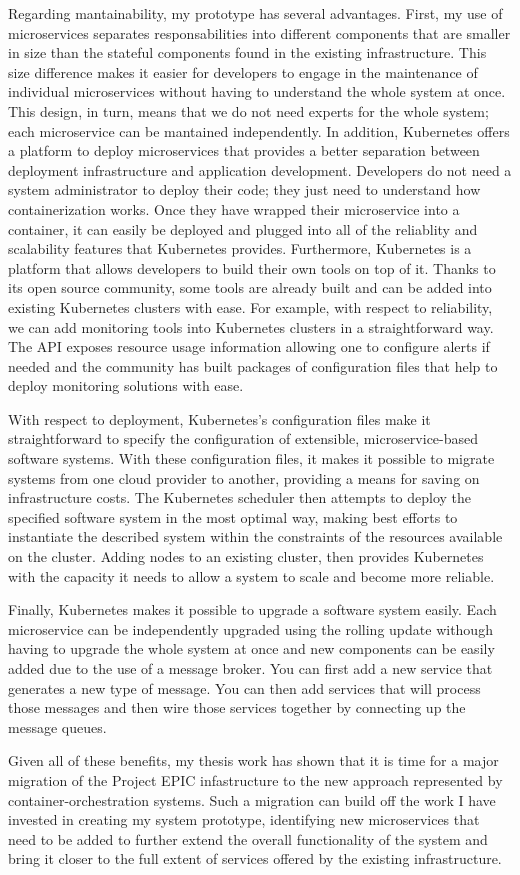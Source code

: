 Regarding mantainability, my prototype has several advantages. First, my use of microservices separates responsabilities into different components that are smaller in size than the stateful components found in the existing infrastructure. This size difference makes it easier for developers to engage in the maintenance of individual microservices without having to understand the whole system at once. This design, in turn, means that we do not need experts for the whole system; each microservice can be mantained independently. In addition, Kubernetes offers a platform to deploy microservices that provides a better separation between deployment infrastructure and application development. Developers do not need a system administrator to deploy their code; they just need to understand how containerization works. Once they have wrapped their microservice into a container, it can easily be deployed and plugged into all of the reliablity and scalability features that Kubernetes provides. Furthermore, Kubernetes is a platform that allows developers to build their own tools on top of it. Thanks to its open source community, some tools are already built and can be added into existing Kubernetes clusters with ease. For example, with respect to reliability, we can add monitoring tools into Kubernetes clusters in a straightforward way. The API exposes resource usage information allowing one to configure alerts if needed and the community has built packages of configuration files that help to deploy monitoring solutions with ease.

With respect to deployment, Kubernetes's configuration files make it straightforward to specify the configuration of extensible, microservice-based software systems. With these configuration files, it makes it possible to migrate systems from one cloud provider to another, providing a means for saving on infrastructure costs. The Kubernetes scheduler then attempts to deploy the specified software system in the most optimal way, making best efforts to instantiate the described system within the constraints of the resources available on the cluster. Adding nodes to an existing cluster, then provides Kubernetes with the capacity it needs to allow a system to scale and become more reliable.

Finally, Kubernetes makes it possible to upgrade a software system easily. Each microservice can be independently upgraded using the rolling update withough having to upgrade the whole system at once and new components can be easily added due to the use of a message broker. You can first add a new service that generates a new type of message. You can then add services that will process those messages and then wire those services together by connecting up the message queues.

Given all of these benefits, my thesis work has shown that it is time for a major migration of the Project EPIC infastructure to the new approach represented by container-orchestration systems. Such a migration can build off the work I have invested in creating my system prototype, identifying new microservices that need to be added to further extend the overall functionality of the system and bring it closer to the full extent of services offered by the existing infrastructure.
